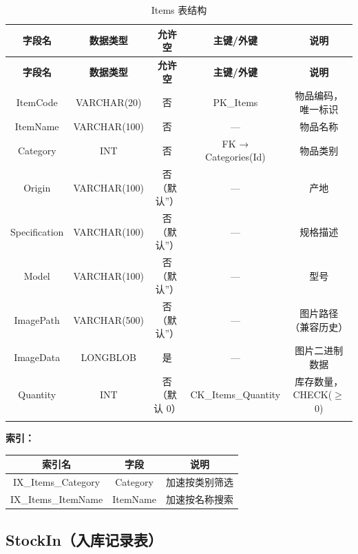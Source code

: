 \documentclass[12pt,a4paper]{ctexart}
\begin{document}
\begin{longtable}{c|c|c|c|c}
\toprule
\textbf{字段名} & \textbf{数据类型} & \textbf{允许空} & \textbf{主键/外键} & \textbf{说明} \\
\midrule
\endfirsthead
\toprule
\textbf{字段名} & \textbf{数据类型} & \textbf{允许空} & \textbf{主键/外键} & \textbf{说明} \\
\midrule
\endhead
ItemCode      & VARCHAR(20)  & 否 & PK\_Items            & 物品编码，唯一标识 \\
ItemName      & VARCHAR(100) & 否 & —                    & 物品名称 \\
Category      & INT          & 否 & FK → Categories(Id)  & 物品类别 \\
Origin        & VARCHAR(100) & 否（默认''）& —                & 产地 \\
Specification & VARCHAR(100) & 否（默认''）& —               & 规格描述 \\
Model         & VARCHAR(100) & 否（默认''）& —              & 型号 \\
ImagePath     & VARCHAR(500) & 否（默认''）& —             & 图片路径（兼容历史） \\
ImageData     & LONGBLOB     & 是 & —                    & 图片二进制数据 \\
Quantity      & INT          & 否（默认 0）& CK\_Items\_Quantity & 库存数量，CHECK($\geq$0) \\
\bottomrule
\caption{Items 表结构}
\end{longtable}

\vspace{4pt}
\textbf{索引：}

\begin{tabular}{c|c|c}
\toprule
\textbf{索引名} & \textbf{字段} & \textbf{说明} \\
\midrule
IX\_Items\_Category & Category  & 加速按类别筛选 \\
IX\_Items\_ItemName & ItemName  & 加速按名称搜索 \\
\bottomrule
\end{tabular}

\subsection{StockIn（入库记录表）}
\end{document}
